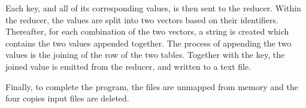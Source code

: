 \documentclass[10pt,twocolumn]{witseiepaper}
\begin{document}
Each key, and all of its corresponding values, is then sent to the reducer. Within the reducer, the values are split into two vectors based on their identifiers. Thereafter, for each combination of the two vectors, a string is created which contains the two values appended together. The process of appending the two values is the joining of the row of the two tables. Together with the key, the joined value is emitted from the reducer, and written to a text file.

Finally, to complete the program, the files are unmapped from memory and the four copies input files are deleted.


%
%
%
%
%
%
%
%
\end{document}
